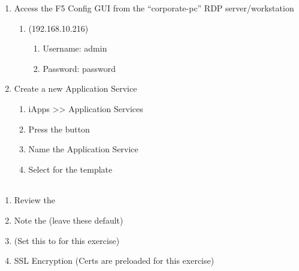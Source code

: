 \documentclass[letterpaper,10pt,english]{sphinxmanual}
\begin{document}
\begin{enumerate}
\item {} 
Access the F5 Config GUI from the “corporate-pc” RDP
server/workstation \textendash{}
\begin{enumerate}
\item {} 
 (192.168.10.216)
\begin{enumerate}
\item {} 
Username: admin

\item {} 
Password: password

\end{enumerate}

\end{enumerate}

\item {} 
Create a new Application Service
\begin{enumerate}
\item {} 
iApps \textgreater{}\textgreater{} Application Services

\item {} 
Press the  button

\item {} 
Name the Application Service 

\item {} 
Select  for the template

\end{enumerate}

\end{enumerate}


\begin{savenotes}\sphinxattablestart
\centering
\begin{tabulary}{\linewidth}[t]{|T|}
\hline
\\
\hline
\end{tabulary}
\par
\sphinxattableend\end{savenotes}
\begin{enumerate}
\item {} 
Review the 

\item {} 
Note the  (leave these default)

\item {} 
 (Set this to  for this
exercise)

\item {} 
SSL Encryption (Certs are preloaded for this exercise)

\end{enumerate}
\end{document}
